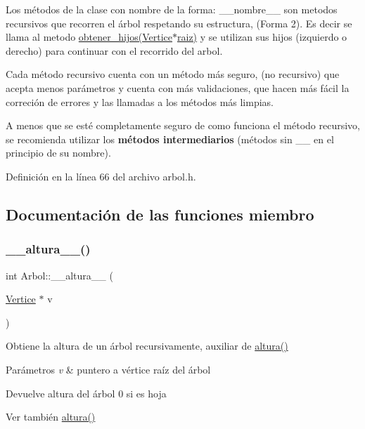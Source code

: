Los métodos de la clase con nombre de la forma\+: \+\_\+\+\_\+nombre\+\_\+\+\_\+ son metodos recursivos que recorren el árbol respetando su estructura, (Forma 2). Es decir se llama al metodo \hyperlink{classArbol_a18066699977ab8095398d026ef2a13ac}{obtener\+\_\+hijos(\+Vertice$\ast$raiz)} y se utilizan sus hijos (izquierdo o derecho) para continuar con el recorrido del arbol.

Cada método recursivo cuenta con un método más seguro, (no recursivo) que acepta menos parámetros y cuenta con más validaciones, que hacen más fácil la correción de errores y las llamadas a los métodos más limpias.

A menos que se esté completamente seguro de como funciona el método recursivo, se recomienda utilizar los {\bfseries métodos intermediarios} (métodos sin \+\_\+\+\_\+ en el principio de su nombre). 

Definición en la línea 66 del archivo arbol.\+h.



\subsection{Documentación de las funciones miembro}
\mbox{\label{classArbol_ab34b0a58f349a2f8153911ad4821a9b9}} 
\subsubsection{\texorpdfstring{\+\_\+\+\_\+altura\+\_\+\+\_\+()}{\_\_altura\_\_()}}
{\footnotesize\ttfamily int Arbol\+::\+\_\+\+\_\+altura\+\_\+\+\_\+ (\begin{DoxyParamCaption}\item[{\hyperlink{classVertice}{Vertice} $\ast$}]{v }\end{DoxyParamCaption})\hspace{0.3cm}{\ttfamily [protected]}}



Obtiene la altura de un árbol recursivamente, auxiliar de \hyperlink{classArbol_a98151655f0dab81b40d34f87fbbd90cd}{altura()} 


\begin{DoxyParams}{Parámetros}
{\em v} & puntero a vértice raíz del árbol \\
\hline
\end{DoxyParams}
\begin{DoxyReturn}{Devuelve}
altura del árbol 0 si es hoja 
\end{DoxyReturn}
\begin{DoxySeeAlso}{Ver también}
\hyperlink{classArbol_a98151655f0dab81b40d34f87fbbd90cd}{altura()} 
\end{DoxySeeAlso}


